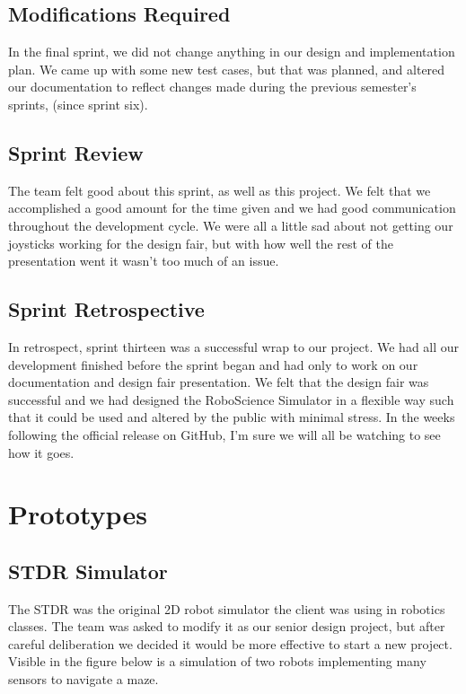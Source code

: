 \subsection{Modifications Required}
In the final sprint, we did not change anything in our design and implementation plan. We came up with some new test cases, but that was planned, and altered our documentation to reflect changes made during the previous semester's sprints, (since sprint six).

\subsection{Sprint Review}
The team felt good about this sprint, as well as this project. We felt that we accomplished a good amount for the time given and we had good communication throughout the development cycle. We were all a little sad about not getting our joysticks working for the design fair, but with how well the rest of the presentation went it wasn't too much of an issue.

\subsection{Sprint Retrospective}
In retrospect, sprint thirteen was a successful wrap to our project. We had all our development finished before the sprint began and had only to work on our documentation and design fair presentation. We felt that the design fair was successful and we had designed the RoboScience Simulator in a flexible way such that it could be used and altered by the public with minimal stress. In the weeks following the official release on GitHub, I'm sure we will all be watching to see how it goes.

\section{Prototypes}

\subsection{STDR Simulator}

The STDR was the original 2D robot simulator the client was using in robotics classes. The team was asked to modify it as our senior design project, but after careful deliberation we decided it would be more effective to start a new project. Visible in the figure below is a simulation of two robots implementing many sensors to navigate a maze.


